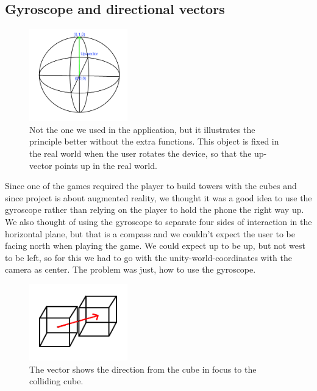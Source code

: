 \subsection{Gyroscope and directional vectors}

\begin{figure}
        \capstart
        \vspace{-20pt}
        \centering
        \includegraphics[width=0.38\textwidth]{images/GyroObjectModel.png}
        \vspace{-20pt}
        \caption[Model of the game-object used to get the direction up]{Not the one we used in the application, but it illustrates the principle better without the extra functions. This object is fixed in the real world when the user rotates the device, so that the up-vector points up in the real world.} 
        \label{fig:Gyro_model} 
        \vspace{-10pt}
\end{figure}

Since one of the games required the player to build towers with the cubes and since project is about augmented reality, we thought it was a good idea to use the gyroscope rather than relying on the player to hold the phone the right way up. We also thought of using the gyroscope to separate four sides of interaction in the horizontal plane, but that is a compass and we couldn't expect the user to be facing north when playing the game. We could expect up to be up, but not west to be left, so for this we had to go with the unity-world-coordinates with the camera as center. The problem was just, how to use the gyroscope.\\

\begin{figure}
        \capstart
        \vspace{-20pt}
        \centering
        \includegraphics[width=0.38\textwidth]{images/CollisionDirectionObject.png}
        \vspace{-20pt}
        \caption[Model of the collision direction vector]{The vector shows the direction from the cube in focus to the colliding cube.} 
        \label{fig:Collision_Direction_model} 
        \vspace{-10pt}
\end{figure}

